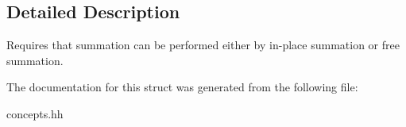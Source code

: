 \subsection{Detailed Description}
Requires that summation can be performed either by in-\/place summation or free summation. 

The documentation for this struct was generated from the following file\-:\begin{DoxyCompactItemize}
\item 
concepts.\-hh\end{DoxyCompactItemize}
